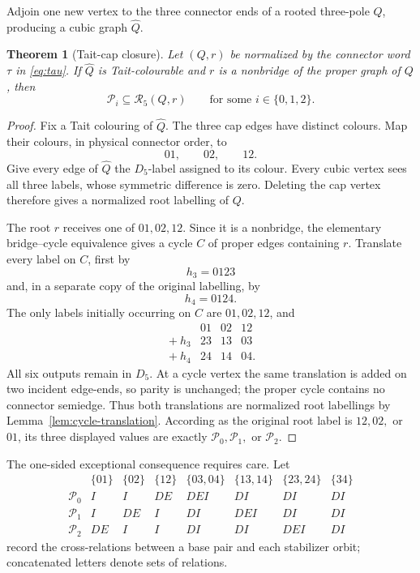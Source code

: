 \documentclass[11pt]{article}
\newtheorem{theorem}{Theorem}[section]
\theoremstyle{definition}
\theoremstyle{remark}
\begin{document}
Adjoin one new vertex to the three connector ends of a rooted
three-pole \(Q\), producing a cubic graph \(\widehat Q\).

\begin{theorem}[Tait-cap closure]
\label{thm:tait-cap-closure}
Let \((Q,r)\) be normalized by the connector word \(\tau\) in
\eqref{eq:tau}.  If \(\widehat Q\) is Tait-colourable and \(r\) is a
nonbridge of the proper graph of \(Q\), then
\[
 \mathcal P_i\subseteq\mathcal R_5(Q,r)
 \qquad\text{for some }i\in\{0,1,2\}.                 \tag{6.11}
\]
\end{theorem}

\begin{proof}
Fix a Tait colouring of \(\widehat Q\).  The three cap edges have
distinct colours.  Map their colours, in physical connector order, to
\[
                         01,\qquad02,\qquad12.
\]
Give every edge of \(\widehat Q\) the \(D_5\)-label assigned to its
colour.  Every cubic vertex sees all three labels, whose symmetric
difference is zero.  Deleting the cap vertex therefore gives a
normalized root labelling of \(Q\).

The root \(r\) receives one of \(01,02,12\).  Since it is a nonbridge,
the elementary bridge--cycle equivalence gives a cycle \(C\) of proper
edges containing \(r\).  Translate every label on \(C\), first by
\[
                         h_3=0123
\]
and, in a separate copy of the original labelling, by
\[
                         h_4=0124.
\]
The only labels initially occurring on \(C\) are \(01,02,12\), and
\[
\begin{array}{c|ccc}
 &01&02&12\\ \hline
{}+h_3&23&13&03\\
{}+h_4&24&14&04.
\end{array}                                                    \tag{6.12}
\]
All six outputs remain in \(D_5\).  At a cycle vertex the same
translation is added on two incident edge-ends, so parity is unchanged;
the proper cycle contains no connector semiedge.  Thus both translations
are normalized root labellings by
Lemma~\ref{lem:cycle-translation}.  According as the original root
label is \(12,02,\) or \(01\), its three displayed values are exactly
\(\mathcal P_0,\mathcal P_1,\) or \(\mathcal P_2\).
\end{proof}

The one-sided exceptional consequence requires care.  Let
\[
\begin{array}{c|ccccccc}
 &\{01\}&\{02\}&\{12\}&\{03,04\}&\{13,14\}&\{23,24\}&\{34\}\\ \hline
\mathcal P_0&I&I&DE&DEI&DI&DI&DI\\
\mathcal P_1&I&DE&I&DI&DEI&DI&DI\\
\mathcal P_2&DE&I&I&DI&DI&DEI&DI
\end{array}                                                    \tag{6.13}
\label{eq:tait-relation-table}
\]
record the cross-relations between a base pair and each stabilizer
orbit; concatenated letters denote sets of relations.
\end{document}
